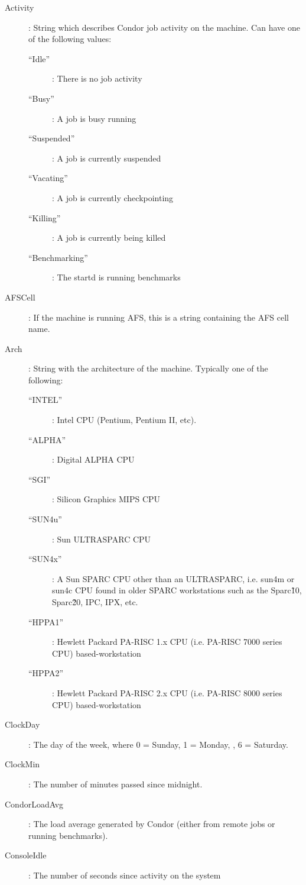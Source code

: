 \begin{description}
%
\item[Activity] : String which describes Condor job activity on the machine.
Can have one of the following values:
	\begin{description}
	\item[``Idle''] : There is no job activity
	\item[``Busy''] : A job is busy running
	\item[``Suspended''] : A job is currently suspended
	\item[``Vacating''] : A job is currently checkpointing
	\item[``Killing''] : A job is currently being killed
	\item[``Benchmarking''] : The startd is running benchmarks
	\end{description}
%
\item[AFSCell] : If the machine is running AFS, this is a string
containing the AFS cell name.
%
\item[Arch] : String with the architecture of the machine.  Typically
one of the following: 
	\begin{description}
	\item[``INTEL''] : Intel CPU (Pentium, Pentium II, etc).
	\item[``ALPHA''] : Digital ALPHA CPU
	\item[``SGI''] : Silicon Graphics MIPS CPU
	\item[``SUN4u''] : Sun ULTRASPARC CPU
	\item[``SUN4x''] : A Sun SPARC CPU other than an ULTRASPARC, i.e.
sun4m or sun4c CPU found in older SPARC workstations such as the Sparc\~10, 
Sparc\~20, IPC, IPX, etc.
	\item[``HPPA1''] :  Hewlett Packard PA-RISC 1.x CPU (i.e. PA-RISC    
                      7000 series CPU) based-workstation
	\item[``HPPA2''] :  Hewlett Packard PA-RISC 2.x CPU (i.e. PA-RISC    
                      8000 series CPU) based-workstation
	\end{description}
%
\item[ClockDay] : The day of the week, where 0 = Sunday, 1 = Monday, \Dots, 6 = Saturday. 
%
\item[ClockMin] : The number of minutes passed since midnight.
%
\item[CondorLoadAvg] : The load average generated by Condor (either
from remote jobs or running benchmarks).
%
\item[ConsoleIdle] : The number of seconds since activity on the system

\end{description}

